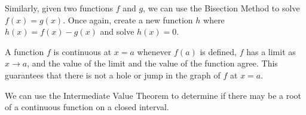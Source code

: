Similarly, given two functions $f$ and $g$, we can use the Bisection Method to solve $f(x) = g(x)$. Once again, create a new function $h$ where $h(x) = f(x)-g(x)$ and solve $h(x) = 0$. 


\begin{summary}
\item A function $f$ is continuous at $x = a$ whenever $f(a)$ is defined, $f$ has a limit as $x \to a$, and the value of the limit and the value of the function agree.  This guarantees that there is not a hole or jump in the graph of $f$ at $x = a$.

\item We can use the Intermediate Value Theorem to determine if there may be a root of a continuous function on a closed interval.
\end{summary}

\clearpage

 

\cleardoublepage